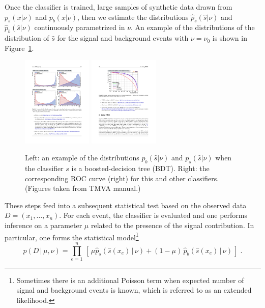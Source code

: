 \documentclass[aoas,preprint]{imsart}
\numberwithin{equation}{section}
\theoremstyle{plain}
\begin{document}
 Once the classifier is trained, large samples of synthetic data drawn from $p_s(x | \nu)$ and $p_b(x | \nu)$, then we estimate the distributions  $\hat{p}_s(\hat s | \nu)$ and $\hat{p}_b(\hat s | \nu)$ continuously parametrized in $\nu$. 
An example of the distributions of the distribution of $\hat s$ for the signal and background events with $\nu=\nu_0$ is shown in Figure~\ref{fig:tmva}.


\begin{figure}[htbp]
\begin{center}
 \includegraphics[height=1.7in]{example-TMVA-BDT.pdf}
 \includegraphics[height=1.7in]{example-TMVA-ROC.pdf}
\caption{Left: an example of the distributions $p_b(\hat s|\nu)$ and $p_s(\hat s|\nu)$ when the classifier $s$ is a boosted-decision tree (BDT). Right: the corresponding ROC curve (right) for this and other classifiers. (Figures taken from TMVA manual.)}
\label{fig:tmva}
\end{center}
\end{figure}

These steps feed into a subsequent statistical test based on the observed data \\
${D=(x_1, \dots, x_n)}$. For each event, the classifier is evaluated and one performs inference on a parameter $\mu$ related to the presence of the signal contribution. In particular, one forms the statistical model\footnote{Sometimes there is an additional Poisson term when expected number of signal and background events is known, which is referred to as an extended likelihood.} 
\begin{equation}\label{eq:typicalML}
p( D \,|\, \mu, \nu) = \prod_{e=1}^n \, \left[\, \mu \hat{p}_s( \hat s(x_e) \, |\,  \nu)  + (1-\mu)\, \hat{p}_b( \hat s(x_e) \,|\, \nu) \,\right] \; .
\end{equation}
\end{document}
